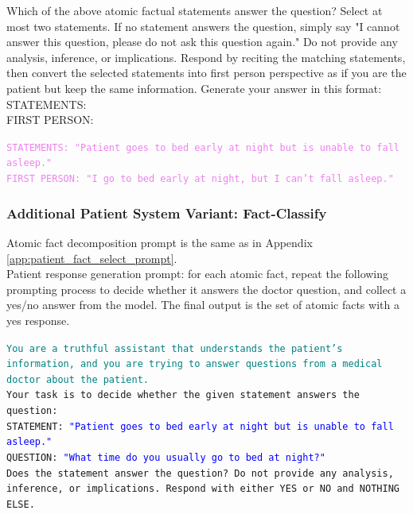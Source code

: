 \begin{tcolorbox}[title={Patient Response Generation Prompt -- Fact-FP}, colframe=gray]
{Which of the above atomic factual statements answer the question? Select at most two statements. If no statement answers the question, simply say "I cannot answer this question, please do not ask this question again." Do not provide any analysis, inference, or implications. Respond by reciting the matching statements, then convert the selected statements into first person perspective as if you are the patient but keep the same information. Generate your answer in this format:\vspace{4mm}\\
STATEMENTS: \\
FIRST PERSON:}\normalsize
\end{tcolorbox}

\begin{tcolorbox}[title={Example LLM Output}, colframe=gray]
\small\texttt{\textcolor{violet}{STATEMENTS: "Patient goes to bed early at night but is unable to fall asleep."\\
FIRST PERSON: "I go to bed early at night, but I can't fall asleep."}}\normalsize
\end{tcolorbox}

\subsubsection{Additional Patient System Variant: Fact-Classify}\label{app:patient_fact_binary_prompt}
Atomic fact decomposition prompt is the same as in Appendix \ref{app:patient_fact_select_prompt}.\\
Patient response generation prompt: for each atomic fact, repeat the following prompting process to decide whether it answers the doctor question, and collect a yes/no answer from the model. The final output is the set of atomic facts with a yes response.

\begin{tcolorbox}[title={Patient Response Generation Prompt -- Fact-Classify}, colframe=gray]
\small\texttt{\textcolor{teal}{You are a truthful assistant that understands the patient's information, and you are trying to answer questions from a medical doctor about the patient.}\\
Your task is to decide whether the given statement answers the question:\vspace{4mm}\\
STATEMENT: \textcolor{blue}{"Patient goes to bed early at night but is unable to fall asleep."}\\
QUESTION: \textcolor{blue}{"What time do you usually go to bed at night?"}\vspace{4mm}\\
Does the statement answer the question? Do not provide any analysis, inference, or implications. Respond with either YES or NO and NOTHING ELSE.}\normalsize
\end{tcolorbox}

